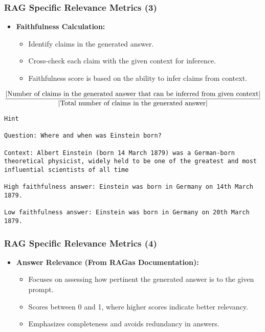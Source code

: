 \begin{frame}[fragile]\frametitle{RAG Specific Relevance Metrics (3)}
  \begin{itemize}
    \item \textbf{Faithfulness Calculation:}
      \begin{itemize}
        \item Identify claims in the generated answer.
        \item Cross-check each claim with the given context for inference.
        \item Faithfulness score is based on the ability to infer claims from context.
      \end{itemize}
  \end{itemize}
$${|\text{Number of claims in the generated answer that can be inferred from given context}| \over |\text{Total number of claims in the generated answer}|}$$  

\begin{lstlisting}
Hint

Question: Where and when was Einstein born?

Context: Albert Einstein (born 14 March 1879) was a German-born theoretical physicist, widely held to be one of the greatest and most influential scientists of all time

High faithfulness answer: Einstein was born in Germany on 14th March 1879.

Low faithfulness answer: Einstein was born in Germany on 20th March 1879.
\end{lstlisting}
\end{frame}

\begin{frame}[fragile]\frametitle{RAG Specific Relevance Metrics (4)}
  \begin{itemize}
    \item \textbf{Answer Relevance (From RAGas Documentation):}
      \begin{itemize}
        \item Focuses on assessing how pertinent the generated answer is to the given prompt.
        \item Scores between 0 and 1, where higher scores indicate better relevancy.
        \item Emphasizes completeness and avoids redundancy in answers.
      \end{itemize}
  \end{itemize}
\end{frame}

